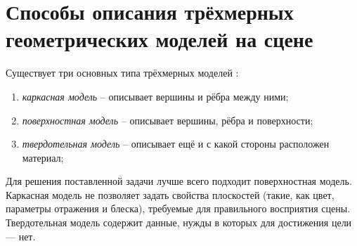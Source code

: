 \section{Способы описания трёхмерных геометрических моделей на сцене}

Существует три основных типа трёхмерных моделей \cite{CGPaP}:
\begin{enumerate}
    \item \emph{каркасная модель} -- описывает вершины и рёбра между ними;
    \item \emph{поверхностная модель} -- описывает вершины, рёбра и поверхности;
    \item \emph{твердотельная модель} -- описывает ещё и с какой стороны расположен материал;
\end{enumerate}

Для решения поставленной задачи лучше всего подходит поверхностная модель. 
Каркасная модель не позволяет задать свойства плоскостей (такие, как цвет, параметры отражения и блеска), требуемые для правильного восприятия сцены.
Твердотельная модель содержит данные, нужды в которых для достижения цели --- нет.
